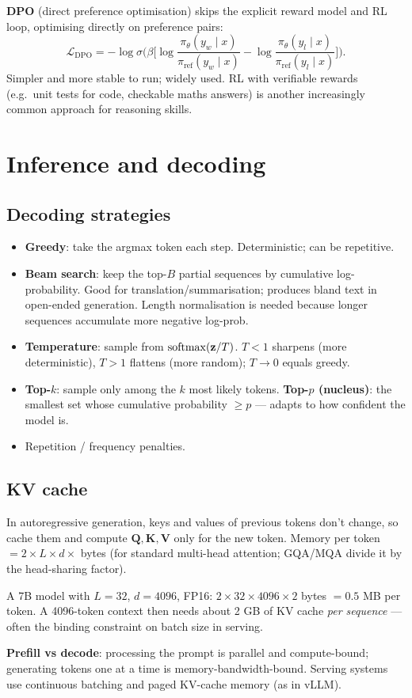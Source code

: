 \textbf{DPO} (direct preference optimisation) skips the explicit reward model and RL loop, optimising directly on preference pairs:
\[\mathcal{L}_{\text{DPO}}=-\log\sigma\Big(\beta\Big[\log\frac{\pi_\theta(y_w\mid x)}{\pi_{\text{ref}}(y_w\mid x)}-\log\frac{\pi_\theta(y_l\mid x)}{\pi_{\text{ref}}(y_l\mid x)}\Big]\Big).\]
Simpler and more stable to run; widely used. RL with verifiable rewards (e.g.\ unit tests for code, checkable maths answers) is another increasingly common approach for reasoning skills.

\section{Inference and decoding}
\subsection{Decoding strategies}
\begin{itemize}
  \item \textbf{Greedy}: take the argmax token each step. Deterministic; can be repetitive.
  \item \textbf{Beam search}: keep the top-$B$ partial sequences by cumulative log-probability. Good for translation/summarisation; produces bland text in open-ended generation. Length normalisation is needed because longer sequences accumulate more negative log-prob.
  \item \textbf{Temperature}: sample from $\operatorname{softmax}(\mathbf{z}/T)$. $T<1$ sharpens (more deterministic), $T>1$ flattens (more random); $T\to0$ equals greedy.
  \item \textbf{Top-$k$}: sample only among the $k$ most likely tokens. \textbf{Top-$p$ (nucleus)}: the smallest set whose cumulative probability $\ge p$ --- adapts to how confident the model is.
  \item Repetition / frequency penalties.
\end{itemize}

\subsection{KV cache}
In autoregressive generation, keys and values of previous tokens don't change, so cache them and compute $\mathbf{Q},\mathbf{K},\mathbf{V}$ only for the new token. Memory per token $=2\times L\times d\times$ bytes (for standard multi-head attention; GQA/MQA divide it by the head-sharing factor).
\begin{example}
A 7B model with $L=32$, $d=4096$, FP16: $2\times32\times4096\times2$ bytes $=0.5$ MB per token. A 4096-token context then needs about 2 GB of KV cache \emph{per sequence} --- often the binding constraint on batch size in serving.
\end{example}
\textbf{Prefill vs decode}: processing the prompt is parallel and compute-bound; generating tokens one at a time is memory-bandwidth-bound. Serving systems use continuous batching and paged KV-cache memory (as in vLLM).


